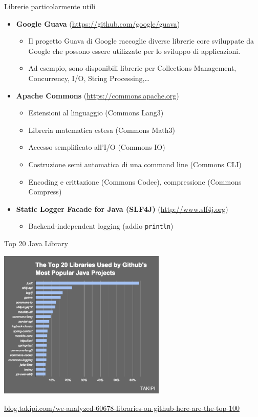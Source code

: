 \documentclass[presentation]{beamer}
\begin{document}
\begin{frame}{Librerie particolarmente utili}
	\begin{itemize}\itemsep15pt
		\item \textbf{Google Guava} (\url{https://github.com/google/guava})
		\begin{itemize}
			\item Il progetto Guava di Google raccoglie diverse librerie core sviluppate da Google che possono essere utilizzate per lo sviluppo di applicazioni.
			\item Ad esempio, sono disponibili librerie per Collections Management, Concurrency, I/O, String Processing,\dots
		\end{itemize}
		\item \textbf{Apache Commons} (\url{https://commons.apache.org})
		\begin{itemize}
			\item Estensioni al linguaggio (Commons Lang3)
			\item Libreria matematica estesa (Commons Math3)
			\item Accesso semplificato all'I/O (Commons IO)
			\item Costruzione semi automatica di una command line (Commons CLI)
			\item Encoding e crittazione (Commons Codec), compressione (Commons Compress)
		\end{itemize}
		\item \textbf{Static Logger Facade for Java (SLF4J)} (\url{http://www.slf4j.org})
		\begin{itemize}
			\item Backend-independent logging (addio \texttt{println})
		\end{itemize}
	\end{itemize}
\end{frame}

\begin{frame}{Top 20 Java Library}
	\begin{center}
		\includegraphics[width=0.6\textwidth]{img/top-20-java-libraries}
	\end{center}
	{\scriptsize \url{blog.takipi.com/we-analyzed-60678-libraries-on-github-here-are-the-top-100}}
\end{frame}
\end{document}
